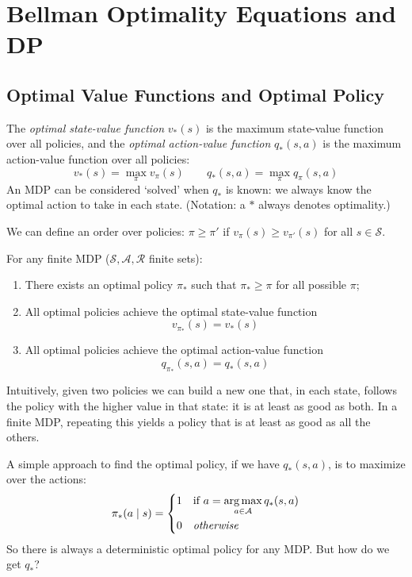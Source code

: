 \chapter{Bellman Optimality Equations and DP}

\section{Optimal Value Functions and Optimal Policy}
The \textit{optimal state-value function} $v_*(s)$ is the maximum state-value function over all policies, and the \textit{optimal action-value function} $q_*(s,a)$ is the maximum action-value function over all policies:
\[v_*(s)=\max_\pi v_\pi(s)\qquad q_*(s,a)=\max_\pi q_\pi(s,a)\]
An MDP can be considered `solved' when $q_*$ is known: we always know the optimal action to take in each state. (Notation: a $*$ always denotes optimality.)

We can define an order over policies: $\pi\geq\pi'$ if $v_\pi(s)\geq v_{\pi'}(s)$ for all $s\in\mathcal{S}$.
\begin{theorem}
    For any finite MDP ($\mathcal{S},\mathcal{A}, \mathcal{R}$ finite sets):
    \begin{enumerate}
        \item There exists an optimal policy $\pi_*$ such that $\pi_*\geq\pi$ for all possible $\pi$;
        \item All optimal policies achieve the optimal state-value function \[v_{\pi_*}(s)=v_*(s)\]
        \item All optimal policies achieve the optimal action-value function \[q_{\pi_*}(s,a)=q_*(s,a)\]
    \end{enumerate}
\end{theorem}
Intuitively, given two policies we can build a new one that, in each state, follows the policy with the higher value in that state: it is at least as good as both. In a finite MDP, repeating this yields a policy that is at least as good as all the others.

A simple approach to find the optimal policy, if we have $q_*(s,a)$, is to maximize over the actions:
\[
  \pi_*(a \mid s) =
  \begin{dcases}
    1 & \text{if } a = \operatorname*{arg\,max}_{a \in \mathcal{A}} q_*(s, a) \\
    0 & \textit{otherwise}
  \end{dcases}
\]
So there is always a deterministic optimal policy for any MDP. But how do we get $q_*$?

